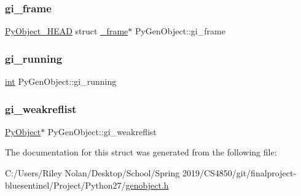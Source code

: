\mbox{\label{struct_py_gen_object_a9601d467ad3d67fc2c0ddc563b8a9435}} 
\subsubsection{\texorpdfstring{gi\_frame}{gi\_frame}}
{\footnotesize\ttfamily \mbox{\hyperlink{_python27_2object_8h_a0bf35c1f3ea13f925de94d8593db3b7e}{Py\+Object\+\_\+\+H\+E\+AD}} struct \mbox{\hyperlink{struct__frame}{\+\_\+frame}}$\ast$ Py\+Gen\+Object\+::gi\+\_\+frame}

\mbox{\label{struct_py_gen_object_aeaf20c6a757c6759fbd586f7ef6a7d1a}} 
\subsubsection{\texorpdfstring{gi\_running}{gi\_running}}
{\footnotesize\ttfamily \mbox{\hyperlink{warnings_8h_a74f207b5aa4ba51c3a2ad59b219a423b}{int}} Py\+Gen\+Object\+::gi\+\_\+running}

\mbox{\label{struct_py_gen_object_a0d828fd28fbb252b6afd214d40154b43}} 
\subsubsection{\texorpdfstring{gi\_weakreflist}{gi\_weakreflist}}
{\footnotesize\ttfamily \mbox{\hyperlink{_python27_2object_8h_aadc84ac7aed2cfa6f20c25f62bf3dac7}{Py\+Object}}$\ast$ Py\+Gen\+Object\+::gi\+\_\+weakreflist}



The documentation for this struct was generated from the following file\+:\begin{DoxyCompactItemize}
\item 
C\+:/\+Users/\+Riley Nolan/\+Desktop/\+School/\+Spring 2019/\+C\+S4850/git/finalproject-\/bluesentinel/\+Project/\+Python27/\mbox{\hyperlink{genobject_8h}{genobject.\+h}}\end{DoxyCompactItemize}
